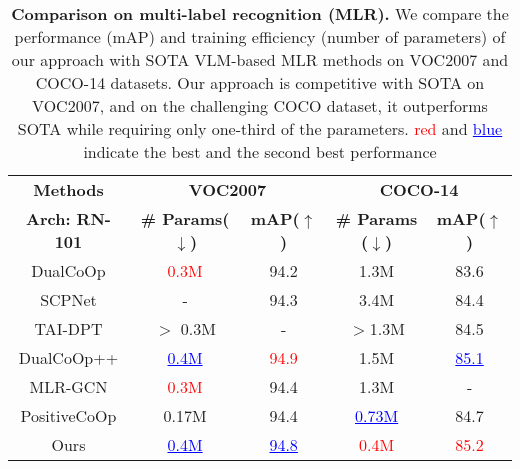 \begin{table*}[tp]
\centering
\caption{\textbf{Comparison on multi-label recognition (MLR).} We compare the performance (mAP) and training efficiency (number of parameters) of our approach with SOTA VLM-based MLR methods on VOC2007 and COCO-14 datasets. Our approach is competitive with SOTA on VOC2007, and on the challenging COCO dataset, it outperforms SOTA while requiring only one-third of the parameters. \textcolor{red}{red} and \textcolor{blue}{\underline{blue}} indicate the best and the second best performance}
\small
\begin{tabular}{ccccc}
\toprule
\textbf{Methods}               & \multicolumn{2}{c}{\textbf{VOC2007}}       & \multicolumn{2}{c}{\textbf{COCO-14}}       \\  \cmidrule(lr){2-3} \cmidrule(lr){4-5}
                        \textbf{Arch: RN-101}       & \textbf{\# Params($\downarrow$)} &  \textbf{mAP($\uparrow$)} & \textbf{\# Params ($\downarrow$)} & \textbf{mAP($\uparrow$)} \\ \midrule
DualCoOp \cite{dualcoop}       &  \textcolor{red}{0.3M}           &  94.2          &   1.3M            &   83.6       \\
SCPNet \cite{scpnet}           &  -              &  94.3          &   3.4M            &   84.4       \\
TAI-DPT \cite{TaI-DPT}         & $>$ 0.3M        & -              &   $>$1.3M         &   84.5       \\
DualCoOp++ \cite{dualcoop++}   &  \textcolor{blue}{\underline{0.4M}}           &  \textcolor{red}{94.9} &   1.5M            &   \textcolor{blue}{\underline{85.1}}       \\
MLR-GCN \cite{MLR-GCN}         &  \textcolor{red}{0.3M}           &  94.4          &   1.3M            &    -         \\
PositiveCoOp \cite{PositiveCoOp}    &  0.17M          &  94.4          &  \textcolor{blue}{\underline{0.73M}}           &   84.7        \\
\midrule
Ours                           &  \textcolor{blue}{\underline{0.4M}}          &  \textcolor{blue}{\underline{94.8}}  &  \textcolor{red}{0.4M}   &   \textcolor{red}{85.2}        \\ \bottomrule
\end{tabular}

\label{tab:MLR performance}
\end{table*}
